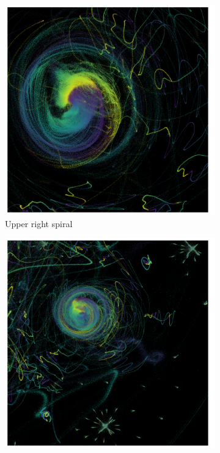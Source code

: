 \documentclass[12pt]{article}
\begin{document}
\begin{figure}
    \centering
    \begin{subfigure}{0.45\textwidth}
        \includegraphics[width=\textwidth]{Swirl.png}
        \caption{Upper right spiral}
    \end{subfigure}
    \begin{subfigure}{0.45\textwidth}
        \includegraphics[width=\textwidth]{swirl_and_starbursts.png}

\end{subfigure}
\end{figure}
\end{document}
